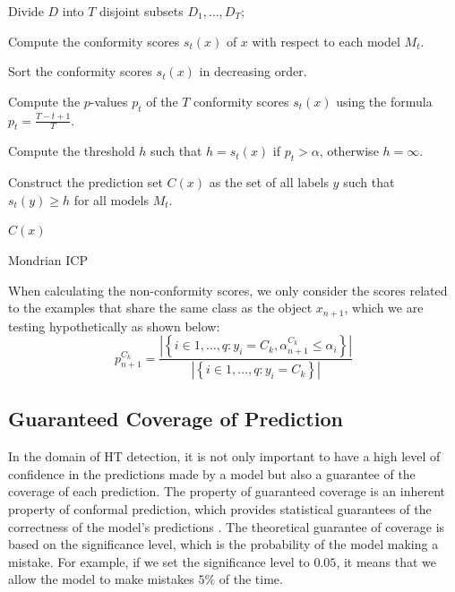 \begin{algorithm}[t]
Divide $D$ into $T$ disjoint subsets $D_1, \ldots, D_T$;

Compute the conformity scores $s_t(x)$ of $x$ with respect to each model $M_t$.

Sort the conformity scores $s_t(x)$ in decreasing order.

Compute the $p$-values $p_t$ of the $T$ conformity scores $s_t(x)$ using the formula $p_t = \frac{T - t + 1}{T}$.

Compute the threshold $h$ such that $h = s_t(x)$ if $p_t > \alpha$, otherwise $h = \infty$.

Construct the prediction set $C(x)$ as the set of all labels $y$ such that $s_t(y) \geq h$ for all models $M_t$.

\Return $C(x)$
\caption{Mondrian ICP}
\label{algo:mcp}
\end{algorithm}

When calculating the non-conformity scores, we only consider the scores related to the examples that share the same class as the object $x_{n+1}$, which we are testing hypothetically as shown below: 
$$
p_{n+1}^{C_k}=\frac{\left|\left\{i \in 1, \ldots, q: y_i=C_k, \alpha_{n+1}^{C_k} \leq \alpha_i\right\}\right|}{\left|\left\{i \in 1, \ldots, q: y_i=C_k\right\}\right|}
$$


\subsection*{Guaranteed Coverage of Prediction}
\label{sec:Coverage}
In the domain of HT detection, it is not only important to have a high level of confidence in the predictions made by a model but also a guarantee of the coverage of each prediction. The property of guaranteed coverage is an inherent property of conformal prediction, which provides statistical guarantees of the correctness of the model's predictions \cite{angelopoulos2023conformal}. The theoretical guarantee of coverage is based on the significance level, which is the probability of the model making a mistake. For example, if we set the significance level to $0.05$, it means that we allow the model to make mistakes $5\%$ of the time.

